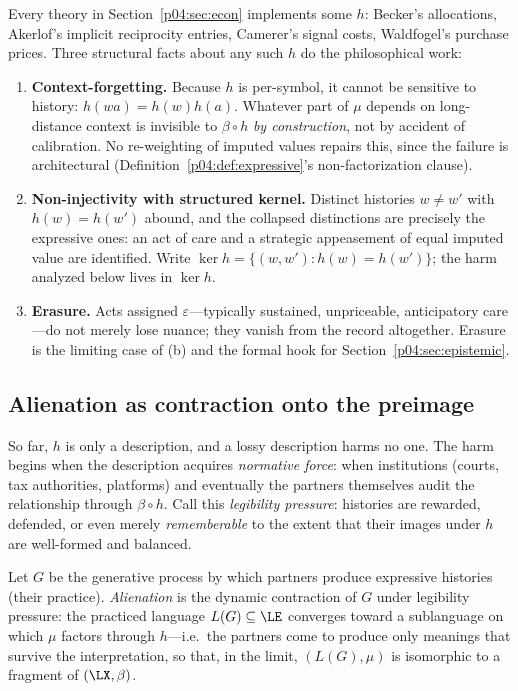 Every theory in Section~\ref{p04:sec:econ} implements some $h$: Becker's
allocations, Akerlof's implicit reciprocity entries, Camerer's signal costs,
Waldfogel's purchase prices. Three structural facts about any such $h$ do the
philosophical work:

\begin{enumerate}[label=(\alph*)]
\item \textbf{Context-forgetting.} Because $h$ is per-symbol, it cannot be
sensitive to history: $h(wa)=h(w)h(a)$. Whatever part of $\mu$ depends on
long-distance context is invisible to $\beta\circ h$ \emph{by construction},
not by accident of calibration. No re-weighting of imputed values repairs
this, since the failure is architectural (Definition~\ref{p04:def:expressive}'s
non-factorization clause).
\item \textbf{Non-injectivity with structured kernel.} Distinct histories
$w \neq w'$ with $h(w)=h(w')$ abound, and the collapsed distinctions are
precisely the expressive ones: an act of care and a strategic appeasement of
equal imputed value are identified. Write
$\ker h = \{(w,w') : h(w)=h(w')\}$; the harm analyzed below lives in
$\ker h$.
\item \textbf{Erasure.} Acts assigned $\varepsilon$---typically sustained,
unpriceable, anticipatory care---do not merely lose nuance; they vanish from
the record altogether. Erasure is the limiting case of (b) and the formal
hook for Section~\ref{p04:sec:epistemic}.
\end{enumerate}

\subsection{Alienation as contraction onto the preimage}
\label{p04:sec:contraction}
So far, $h$ is only a description, and a lossy description harms no one. The
harm begins when the description acquires \emph{normative force}: when
institutions (courts, tax authorities, platforms) and eventually the partners
themselves audit the relationship through $\beta \circ h$. Call this
\emph{legibility pressure}: histories are rewarded, defended, or even merely
\emph{rememberable} to the extent that their images under $h$ are
well-formed and balanced.

\begin{definition}[Alienation]
\label{p04:def:alienation}
Let $G$ be the generative process by which partners produce expressive
histories (their practice). \emph{Alienation} is the dynamic contraction of
$G$ under legibility pressure: the practiced language
$L(G) \subseteq \LE$ converges toward a sublanguage on which $\mu$ factors
through $h$---i.e.\ the partners come to produce only meanings that survive
the interpretation, so that, in the limit, $(L(G),\mu)$ is isomorphic to a
fragment of $(\LX,\beta)$.
\end{definition}

